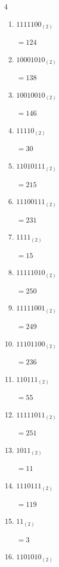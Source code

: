 \begin{multicols}{4}
\begin{enumerate}
        $=131$

  \item $1111100_{(2)}$

        $=124$

  \item $10001010_{(2)}$

        $=138$

  \item $10010010_{(2)}$

        $=146$

  \item $11110_{(2)}$

        $=30$

  \item $11010111_{(2)}$

        $=215$

  \item $11100111_{(2)}$

        $=231$

  \item $1111_{(2)}$

        $=15$

  \item $11111010_{(2)}$

        $=250$

  \item $11111001_{(2)}$

        $=249$

  \item $11101100_{(2)}$

        $=236$

\columnbreak %

  \item $110111_{(2)}$

        $=55$

  \item $11111011_{(2)}$

        $=251$

  \item $1011_{(2)}$

        $=11$

  \item $1110111_{(2)}$

        $=119$

  \item $11_{(2)}$

        $=3$

  \item $1101010_{(2)}$


\end{enumerate}
\end{multicols}
